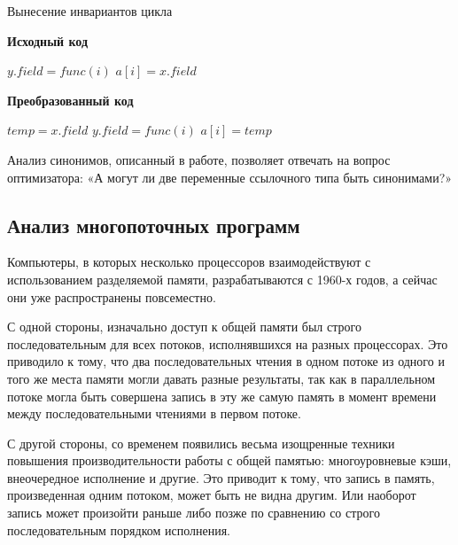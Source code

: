 \documentclass[14pt,titlepage]{extarticle}
\newcommand{\algorithmictitle}[1]{\hspace{8mm}\textbf{#1}}
\begin{document}
      \begin{algorithm}
        \caption{Вынесение инвариантов цикла}
        \label{code:licm}
        \begin{multicols*}{2}
          \algorithmictitle{Исходный код}
          \begin{algorithmic}[1]
            \STATE $y.field = func(i)$
            \STATE $a[i] = x.field$
            \ENDFOR
          \end{algorithmic}
          \columnbreak
          \algorithmictitle{Преобразованный код}
          \begin{algorithmic}[1]
            \STATE $temp = x.field$
            \STATE $y.field = func(i)$
            \STATE $a[i] = temp$
            \ENDFOR
          \end{algorithmic}
        \end{multicols*}
      \end{algorithm}

      Анализ синонимов, описанный в работе, позволяет отвечать на
      вопрос оптимизатора: «А могут ли две переменные ссылочного типа быть
      синонимами?»

    \subsection{Анализ многопоточных программ}
      \label{section:intro_to_multithreading}

      Компьютеры, в которых несколько процессоров взаимодействуют с
      использованием разделяемой памяти, разрабатываются с 1960-х годов, а
      сейчас они уже распространены повсеместно.

      С одной стороны, изначально доступ к общей памяти был строго
      последовательным для всех потоков, исполнявшихся на разных процессорах.
      Это приводило к тому, что два последовательных чтения в одном потоке из
      одного и того же места памяти могли давать разные результаты, так как в
      параллельном потоке могла быть совершена запись в эту же самую память в
      момент времени между последовательными чтениями в первом потоке.

      С другой стороны, со временем появились весьма изощренные техники
      повышения производительности работы с общей памятью: многоуровневые кэши,
      внеочередное исполнение и другие.
      Это приводит к тому, что запись в память, произведенная одним потоком,
      может быть не видна другим. Или наоборот запись может произойти раньше
      либо позже по сравнению со строго последовательным порядком исполнения.
\end{document}
